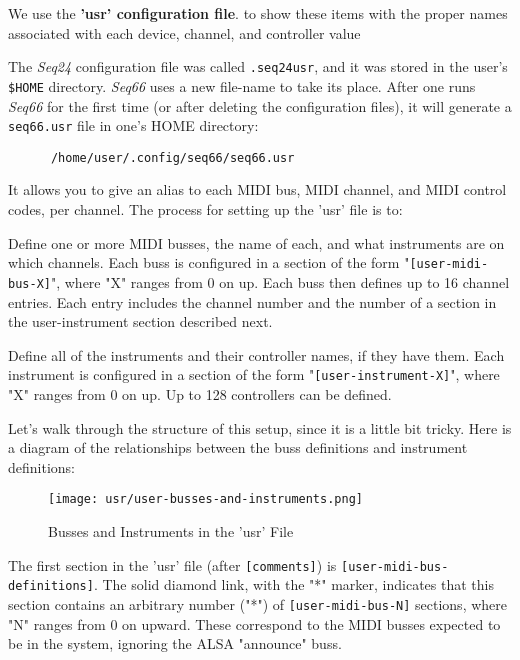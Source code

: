   We use the \textbf{'usr' configuration file}.
   to show these items with the proper
   names associated with each device, channel, and controller value

   The \textsl{Seq24} configuration file was called
   \texttt{.seq24usr}, and it was stored in the user's \texttt{\$HOME}
   directory.
   \textsl{Seq66} uses a new file-name
   to take its place.
   After one runs \textsl{Seq66} for the first time (or after deleting
   the configuration files), it will generate a
   \texttt{seq66.usr} file in one's HOME directory:

   \begin{verbatim}
      /home/user/.config/seq66/seq66.usr
   \end{verbatim}

   It allows you to give an alias to 
   each MIDI bus, MIDI channel, and MIDI control 
   codes, per channel.
   The process for setting up the 'usr' file is to:

   \begin{enumber}
      \item Define one or more MIDI busses, the name of each, and what
         instruments are on which channels.  Each buss is configured in a
         section of the form "\texttt{[user-midi-bus-X]}", where "X" ranges
         from 0 on up.  Each buss then defines up to 16 channel entries.
         Each entry includes the channel number and the number of a
         section in the user-instrument section described next.
      \item Define all of the instruments and their controller
         names, if they have them.  Each instrument is configured in a
         section of the form "\texttt{[user-instrument-X]}", where "X"
         ranges from 0 on up.  Up to 128 controllers can be defined.
   \end{enumber}

   Let's walk through the structure of this setup, since it is a little bit
   tricky.  Here is a diagram of the relationships between the buss definitions
   and instrument definitions:

\begin{figure}[H]
   \centering 
   \texttt{[image: usr/user-busses-and-instruments.png]}
   \caption{Busses and Instruments in the 'usr' File}
   \label{fig:manual_user_busses_and_instruments}
\end{figure}

   The first section in the 'usr' file (after \texttt{[comments]})
   is \texttt{[user-midi-bus-definitions]}.  The solid diamond link, with the
   "*" marker, indicates that this section contains an arbitrary number ("*")
   of \texttt{[user-midi-bus-N]} sections, where "N" ranges from 0 on upward.
   These correspond to the MIDI busses expected to be in the system, ignoring
   the ALSA "announce" buss.

